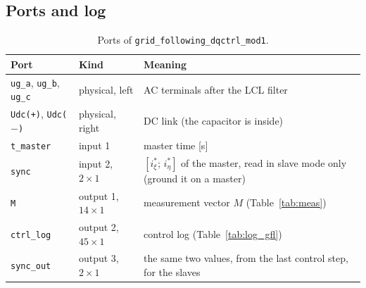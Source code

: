 \documentclass[11pt,a4paper]{scrartcl}
\newcommand{\code}[1]{\texttt{#1}}
\begin{document}
\begin{onehalfspace}
\subsection{Ports and log}
\label{sec:gfl_ports}

\begin{table}[H]
	\centering
	\captionsetup{width=0.9\textwidth, font=small}
	\caption[Ports of the grid-following block.]{Ports of \code{grid\_following\_dqctrl\_mod1}.}
	\label{tab:ports_gfl}
	\begin{tabularx}{0.95\textwidth}{@{} l l X @{}}
		\toprule
		\textbf{Port} & \textbf{Kind} & \textbf{Meaning} \\
		\midrule
		\code{ug\_a}, \code{ug\_b}, \code{ug\_c} & physical, left & AC terminals after the LCL filter \\
		\code{Udc(+)}, \code{Udc($-$)} & physical, right & DC link (the capacitor is inside) \\
		\code{t\_master} & input 1 & master time [\si{\second}] \\
		\code{sync} & input 2, $2 \times 1$ & $[i^{*}_\xi;\, i^{*}_\eta]$ of the master, read in slave mode only (ground it on a master) \\
		\code{M} & output 1, $14 \times 1$ & measurement vector $M$ (Table~\ref{tab:meas}) \\
		\code{ctrl\_log} & output 2, $45 \times 1$ & control log (Table~\ref{tab:log_gfl}) \\
		\code{sync\_out} & output 3, $2 \times 1$ & the same two values, from the last control step, for the slaves \\
		\bottomrule
	\end{tabularx}
\end{table}


\end{onehalfspace}
\end{document}
